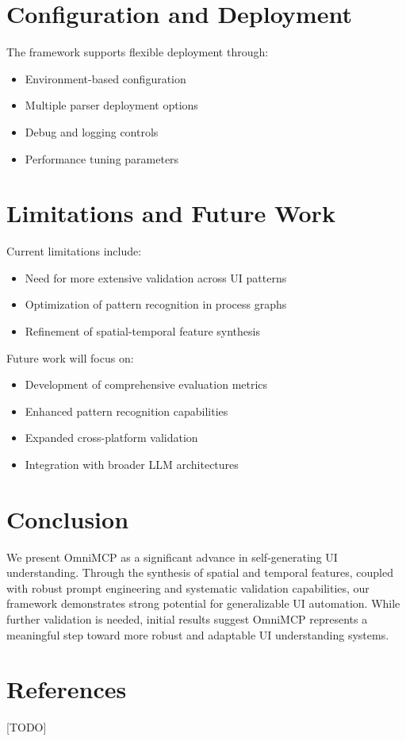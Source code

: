 \documentclass{article}
\begin{document}
\section{Configuration and Deployment}
The framework supports flexible deployment through:

\begin{itemize}
    \item Environment-based configuration
    \item Multiple parser deployment options
    \item Debug and logging controls
    \item Performance tuning parameters
\end{itemize}

\section{Limitations and Future Work}
Current limitations include:
\begin{itemize}
    \item Need for more extensive validation across UI patterns
    \item Optimization of pattern recognition in process graphs
    \item Refinement of spatial-temporal feature synthesis
\end{itemize}

Future work will focus on:
\begin{itemize}
    \item Development of comprehensive evaluation metrics
    \item Enhanced pattern recognition capabilities
    \item Expanded cross-platform validation
    \item Integration with broader LLM architectures
\end{itemize}

\section{Conclusion}
We present OmniMCP as a significant advance in self-generating UI understanding. Through the synthesis of spatial and temporal features, coupled with robust prompt engineering and systematic validation capabilities, our framework demonstrates strong potential for generalizable UI automation. While further validation is needed, initial results suggest OmniMCP represents a meaningful step toward more robust and adaptable UI understanding systems.

\section{References}
[TODO]
\end{document}
